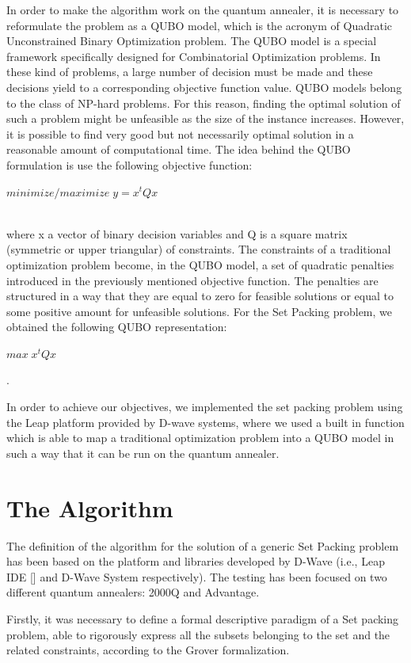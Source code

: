 \documentclass[oneside,a4paper]{article}
\begin{document}
\setlength\parindent{10pt}In order to make the algorithm work on the quantum annealer, it is necessary to reformulate the problem as a QUBO model, which is the acronym of Quadratic Unconstrained Binary Optimization problem. The QUBO model is a special framework specifically designed for Combinatorial Optimization problems. In these kind of problems, a large number of decision must be made and these decisions yield to a corresponding objective function value. QUBO models belong to the class of NP-hard problems. For this reason, finding the optimal solution of such a problem might be unfeasible as the size of the instance increases. However, it is possible to find very good but not necessarily optimal solution in a reasonable amount of computational time.
The idea behind the QUBO formulation is use the following objective function:\\
\centerline{${minimize/maximize\; y = x^tQx}$}\\
where x a vector of binary decision variables and Q is a square matrix (symmetric or upper triangular) of constraints. The constraints of a traditional optimization problem become, in the QUBO model, a set of quadratic penalties introduced in the previously mentioned objective function. The penalties are structured in a way that they are equal to zero for feasible solutions or equal to some positive amount for unfeasible solutions. For the Set Packing problem, we obtained the following QUBO representation: \centerline{${max\; x^tQx}$}.

In order to achieve our objectives, we implemented the set packing problem using the Leap platform provided by D-wave systems, where we used a built in function which is able to map a traditional optimization problem into a QUBO model in such a way that it can be run on the quantum annealer.

\section{The Algorithm}
The definition of the algorithm for the solution of a generic Set Packing problem has been based on the platform and libraries developed by D-Wave (i.e., Leap IDE [] and D-Wave System respectively). The testing has been focused on two different quantum annealers: 2000Q and Advantage.

Firstly, it was necessary to define a formal descriptive paradigm of a Set packing problem, able to rigorously express all the subsets belonging to the set and the related constraints, according to the Grover formalization. 
\end{document}

